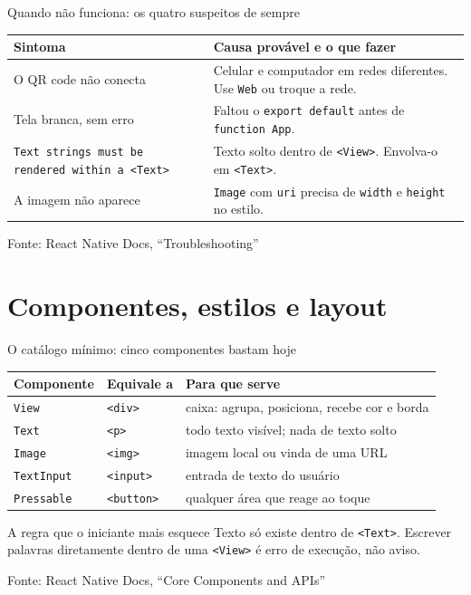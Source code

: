 \documentclass[aspectratio=169]{beamer}
\newcommand{\fonte}[1]{\vfill\hfill{\scriptsize\textcolor{UFSGray}{Fonte: #1}}}
\begin{document}
\begin{frame}{Quando não funciona: os quatro suspeitos de sempre}
  \begin{center}
  \small
  \begin{tabular}{@{}p{4.6cm}p{7.0cm}@{}}
    \toprule
    \textbf{Sintoma} & \textbf{Causa provável e o que fazer} \\
    \midrule
    O QR code não conecta
      & Celular e computador em redes diferentes. Use \texttt{Web} ou troque a rede. \\
    Tela branca, sem erro
      & Faltou o \texttt{export default} antes de \texttt{function App}. \\
    \texttt{Text strings must be rendered within a <Text>}
      & Texto solto dentro de \texttt{<View>}. Envolva-o em \texttt{<Text>}. \\
    A imagem não aparece
      & \texttt{Image} com \texttt{uri} precisa de \texttt{width} e \texttt{height} no estilo. \\
    \bottomrule
  \end{tabular}
  \end{center}
  \fonte{React Native Docs, ``Troubleshooting''~\cite{reactnative2025docs}}
\end{frame}

\section{Componentes, estilos e layout}

\begin{frame}{O catálogo mínimo: cinco componentes bastam hoje}
  \begin{center}
  \small
  \begin{tabular}{@{}llp{6.6cm}@{}}
    \toprule
    \textbf{Componente} & \textbf{Equivale a} & \textbf{Para que serve} \\
    \midrule
    \texttt{View}      & \texttt{<div>}    & caixa: agrupa, posiciona, recebe cor e borda \\
    \texttt{Text}      & \texttt{<p>}      & todo texto visível; nada de texto solto \\
    \texttt{Image}     & \texttt{<img>}    & imagem local ou vinda de uma URL \\
    \texttt{TextInput} & \texttt{<input>}  & entrada de texto do usuário \\
    \texttt{Pressable} & \texttt{<button>} & qualquer área que reage ao toque \\
    \bottomrule
  \end{tabular}
  \end{center}
  \begin{block}{A regra que o iniciante mais esquece}
    Texto só existe dentro de \texttt{<Text>}. Escrever palavras diretamente
    dentro de uma \texttt{<View>} é erro de execução, não aviso.
  \end{block}
  \fonte{React Native Docs, ``Core Components and APIs''~\cite{reactnative2025docs}}
\end{frame}
\end{document}

